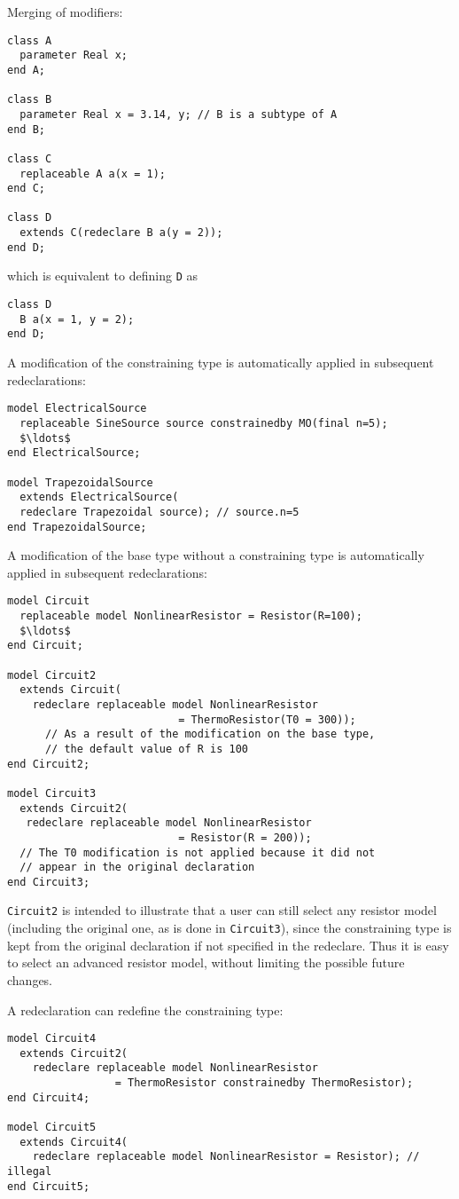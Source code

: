 \begin{example}
Merging of modifiers:
\begin{lstlisting}[language=modelica]
class A
  parameter Real x;
end A;

class B
  parameter Real x = 3.14, y; // B is a subtype of A
end B;

class C
  replaceable A a(x = 1);
end C;

class D
  extends C(redeclare B a(y = 2));
end D;
\end{lstlisting}
which is equivalent to defining \lstinline!D! as
\begin{lstlisting}[language=modelica]
class D
  B a(x = 1, y = 2);
end D;
\end{lstlisting}

A modification of the constraining type is automatically applied in subsequent redeclarations:
\begin{lstlisting}[language=modelica]
model ElectricalSource
  replaceable SineSource source constrainedby MO(final n=5);
  $\ldots$
end ElectricalSource;

model TrapezoidalSource
  extends ElectricalSource(
  redeclare Trapezoidal source); // source.n=5
end TrapezoidalSource;
\end{lstlisting}

A modification of the base type without a constraining type is automatically applied in subsequent redeclarations:
\begin{lstlisting}[language=modelica]
model Circuit
  replaceable model NonlinearResistor = Resistor(R=100);
  $\ldots$
end Circuit;

model Circuit2
  extends Circuit(
    redeclare replaceable model NonlinearResistor
                           = ThermoResistor(T0 = 300));
      // As a result of the modification on the base type,
      // the default value of R is 100
end Circuit2;

model Circuit3
  extends Circuit2(
   redeclare replaceable model NonlinearResistor
                           = Resistor(R = 200));
  // The T0 modification is not applied because it did not
  // appear in the original declaration
end Circuit3;
\end{lstlisting}

\lstinline!Circuit2! is intended to illustrate that a user can still select any resistor model (including the original one, as is done in \lstinline!Circuit3!), since the constraining type is kept from the original declaration if not specified in the redeclare.
Thus it is easy to select an advanced resistor model, without limiting the possible future changes.

A redeclaration can redefine the constraining type:
\begin{lstlisting}[language=modelica]
model Circuit4
  extends Circuit2(
    redeclare replaceable model NonlinearResistor
                 = ThermoResistor constrainedby ThermoResistor);
end Circuit4;

model Circuit5
  extends Circuit4(
    redeclare replaceable model NonlinearResistor = Resistor); // illegal
end Circuit5;
\end{lstlisting}
\end{example}

